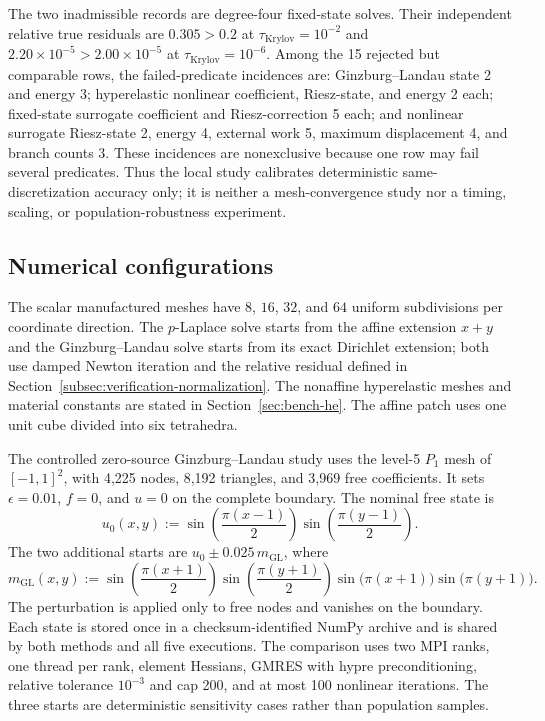 The two inadmissible records are degree-four fixed-state solves. Their
independent relative true residuals are $0.305>0.2$ at
$\tau_{\mathrm{Krylov}}=10^{-2}$ and
$2.20\times10^{-5}>2.00\times10^{-5}$ at
$\tau_{\mathrm{Krylov}}=10^{-6}$. Among the 15 rejected but comparable rows,
the failed-predicate incidences are: Ginzburg--Landau state 2 and energy 3;
hyperelastic nonlinear coefficient, Riesz-state, and energy 2 each;
fixed-state surrogate coefficient and Riesz-correction 5 each; and nonlinear
surrogate Riesz-state 2, energy 4, external work 5, maximum displacement 4,
and branch counts 3. These incidences are nonexclusive because one row may
fail several predicates. Thus the local study calibrates deterministic
same-discretization accuracy only; it is neither a mesh-convergence study nor a
timing, scaling, or population-robustness experiment.

\subsection{Numerical configurations}
\label{subsec:numerical-configurations}

The scalar manufactured meshes have $8$, $16$, $32$, and $64$ uniform
subdivisions per coordinate direction. The $p$-Laplace solve starts from the
affine extension $x+y$ and the Ginzburg--Landau solve starts from its exact
Dirichlet extension; both use damped Newton iteration and the relative residual
defined in Section~\ref{subsec:verification-normalization}. The nonaffine
hyperelastic meshes and material constants are stated in
Section~\ref{sec:bench-he}. The affine patch uses one unit cube divided into six
tetrahedra.

The controlled zero-source Ginzburg--Landau study uses the level-5
$P_1$ mesh of $[-1,1]^2$, with 4,225 nodes, 8,192 triangles, and 3,969 free
coefficients. It sets $\epsilon=0.01$, $f=0$, and $u=0$ on the complete
boundary. The nominal free state is
\begin{equation}
  u_0(x,y):=\sin\!\left(\frac{\pi(x-1)}{2}\right)
             \sin\!\left(\frac{\pi(y-1)}{2}\right).
  \label{eq:gl-globalization-initial-state}
\end{equation}
The two additional starts are
$u_0\pm0.025\,m_{\mathrm{GL}}$, where
\begin{equation}
  m_{\mathrm{GL}}(x,y)
  :=\sin\!\left(\frac{\pi(x+1)}{2}\right)
    \sin\!\left(\frac{\pi(y+1)}{2}\right)
    \sin\!\bigl(\pi(x+1)\bigr)
    \sin\!\bigl(\pi(y+1)\bigr).
  \label{eq:gl-globalization-perturbation}
\end{equation}
The perturbation is applied only to free nodes and vanishes on the boundary.
Each state is stored once in a checksum-identified NumPy archive and is shared
by both methods and all five executions. The comparison uses two MPI ranks,
one thread per rank, element Hessians, GMRES with hypre preconditioning,
relative tolerance $10^{-3}$ and cap 200, and at most 100 nonlinear iterations.
The three starts are deterministic sensitivity cases rather than population
samples.

